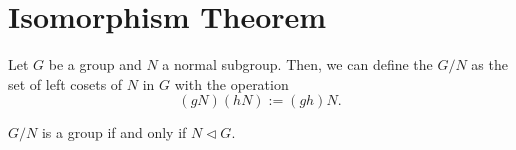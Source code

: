 \section{Isomorphism Theorem}

\begin{definition}\label{def:quotient-group}
    Let $G$ be a group and $N$ a normal subgroup. Then, we can define the  $G/N$ as the set of left cosets of $N$ in $G$ with the operation \[
        (gN)(hN) := (gh)N.
    \]
\end{definition}



\begin{theorem}
    $G/N$ is a group if and only if $N \triangleleft G$.
\end{theorem}

